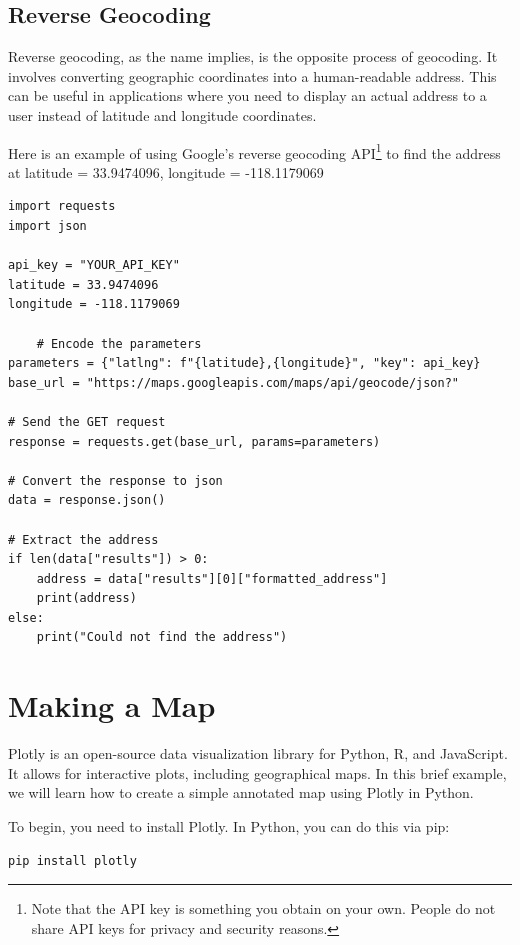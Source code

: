 \subsection{Reverse Geocoding}

Reverse geocoding, as the name implies, is the opposite process of
geocoding. It involves converting geographic coordinates into a
human-readable address. This can be useful in applications where you
need to display an actual address to a user instead of latitude and
longitude coordinates.

Here is an example of using Google's reverse geocoding API\footnote{Note that the API key is something you obtain on your own. People do not share API keys for privacy and security reasons.} to find the
address at latitude = 33.9474096, longitude = -118.1179069


\begin{verbatim}
import requests
import json

api_key = "YOUR_API_KEY"
latitude = 33.9474096
longitude = -118.1179069

    # Encode the parameters
parameters = {"latlng": f"{latitude},{longitude}", "key": api_key}
base_url = "https://maps.googleapis.com/maps/api/geocode/json?"

# Send the GET request
response = requests.get(base_url, params=parameters)

# Convert the response to json
data = response.json()

# Extract the address
if len(data["results"]) > 0:
    address = data["results"][0]["formatted_address"]
    print(address)
else:
    print("Could not find the address")

\end{verbatim}


\section{Making a Map}

Plotly is an open-source data visualization library for Python, R, and
JavaScript. It allows for interactive plots, including geographical
maps. In this brief example, we will learn how to create a simple
annotated map using Plotly in Python.

To begin, you need to install Plotly. In Python, you can do this via pip:

\begin{verbatim}
pip install plotly
\end{verbatim}

